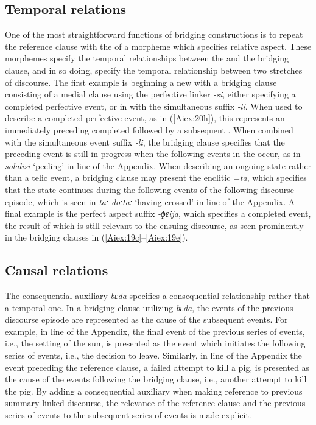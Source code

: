 \documentclass[output=paper]{LSP/langsci}
\begin{document}
\subsection{Temporal relations} 
\label{AiTemporal}
One of the most straightforward functions of bridging constructions is to repeat the reference clause with the  of a morpheme which specifies relative aspect. These morphemes specify the temporal relationships between the  and the bridging clause, and in so doing, specify the temporal relationship between two stretches of discourse. The first example is beginning a new  with a bridging clause consisting of a medial clause using the perfective linker \textit{-si}, either specifying a completed perfective event, or in  with the simultaneous  suffix \textit{-li}. When used to describe a completed perfective event, as in (\ref{Aiex:20h}), this represents an immediately preceding completed  followed by a subsequent . When combined with the simultaneous event suffix \textit{-li}, the bridging clause specifies that the preceding event is still in progress when the following events in the  occur, as in \textit{solalisi} `peeling' in line  of the Appendix. When describing an ongoing state rather than a telic event, a bridging clause may present the enclitic \textit{=ta}, which specifies that the state continues during the following events of the following discourse episode, which is seen in \textit{taː doːtaː} `having crossed' in line  of the Appendix. A final example is the perfect aspect suffix \textit{-ɸɛija}, which specifies a completed event, the result of which is still relevant to the ensuing discourse, as seen prominently in the bridging clauses in (\ref{Aiex:19c}--\ref{Aiex:19e}).

\subsection{Causal relations} 
\label{AiCausal}
The consequential auxiliary \textit{bɛda} specifies a consequential relationship rather that a temporal one. In a bridging clause utilizing \textit{bɛda}, the events of the previous discourse episode are represented as the cause of the subsequent events. For example, in line  of the Appendix, the final event of the previous series of events, i.e., the setting of the sun, is presented as the event which initiates the following series of events, i.e., the decision to leave. Similarly, in line  of the Appendix the event preceding the reference clause, a failed attempt to kill a pig, is presented as the cause of the events following the bridging clause, i.e., another attempt to kill the pig. By adding a consequential auxiliary when making reference to previous summary-linked discourse, the relevance of the reference clause and the previous series of events to the subsequent series of events is made explicit.
	
\end{document}
